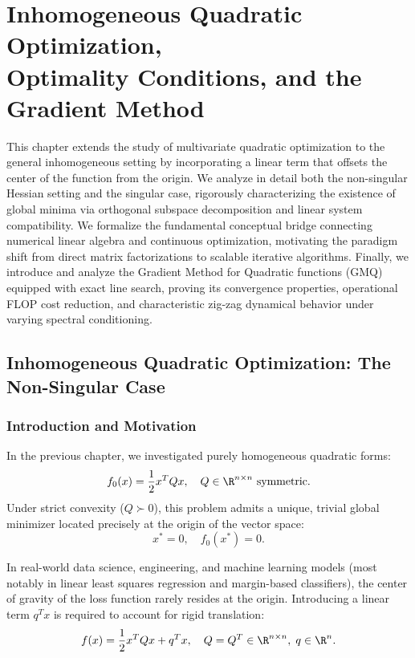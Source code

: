 \chapter[Inhomogeneous Quadratic Optimization and GMQ]{Inhomogeneous Quadratic Optimization,\\Optimality Conditions, and the Gradient Method}
\label{chap:inhomogeneous-quadratic-optimization-gmq}

This chapter extends the study of multivariate quadratic optimization to the general inhomogeneous setting by incorporating a linear term that offsets the center of the function from the origin. We analyze in detail both the non-singular Hessian setting and the singular case, rigorously characterizing the existence of global minima via orthogonal subspace decomposition and linear system compatibility. We formalize the fundamental conceptual bridge connecting numerical linear algebra and continuous optimization, motivating the paradigm shift from direct matrix factorizations to scalable iterative algorithms. Finally, we introduce and analyze the Gradient Method for Quadratic functions (GMQ) equipped with exact line search, proving its convergence properties, operational FLOP cost reduction, and characteristic zig-zag dynamical behavior under varying spectral conditioning.

\FloatBarrier
\section{Inhomogeneous Quadratic Optimization: The Non-Singular Case}
\label{sec:inhomogeneous-quadratic-non-singular}

\subsection{Introduction and Motivation}
In the previous chapter, we investigated purely homogeneous quadratic forms:
\begin{equation}
    f_0(x) = \frac{1}{2} x^T Q x, \quad Q \in \R^{n \times n} \text{ symmetric}.
\end{equation}
Under strict convexity ($Q \succ 0$), this problem admits a unique, trivial global minimizer located precisely at the origin of the vector space:
\begin{equation}
    x^* = 0, \quad f_0(x^*) = 0.
\end{equation}

In real-world data science, engineering, and machine learning models (most notably in linear least squares regression and margin-based classifiers), the center of gravity of the loss function rarely resides at the origin. Introducing a linear term $q^T x$ is required to account for rigid translation:
\begin{equation}
    f(x) = \frac{1}{2} x^T Q x + q^T x, \quad Q = Q^T \in \R^{n \times n}, \; q \in \R^n.
    \label{eq:inhomogeneous-quadratic}
\end{equation}

